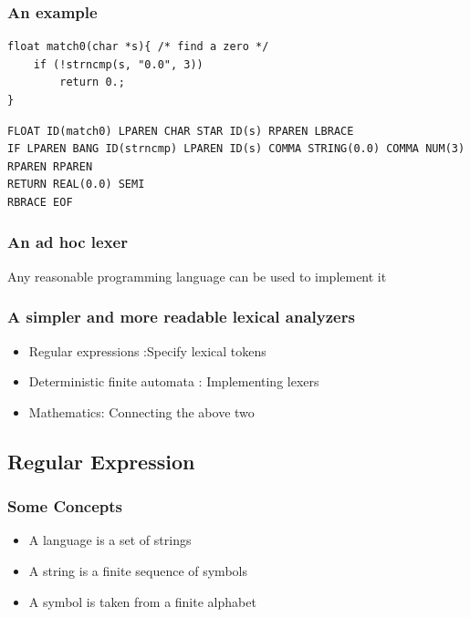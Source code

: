 \subsubsection{An example}
\begin{verbatim}
float match0(char *s){ /* find a zero */
    if (!strncmp(s, "0.0", 3))
        return 0.;
}
\end{verbatim}

\begin{verbatim}
FLOAT ID(match0) LPAREN CHAR STAR ID(s) RPAREN LBRACE 
IF LPAREN BANG ID(strncmp) LPAREN ID(s) COMMA STRING(0.0) COMMA NUM(3) RPAREN RPAREN 
RETURN REAL(0.0) SEMI 
RBRACE EOF
\end{verbatim}



\subsubsection{An ad hoc lexer}
Any reasonable programming language can be used to implement it

\subsubsection{A simpler and more readable lexical analyzers}
\begin{itemize}
    \item Regular expressions :Specify lexical tokens
    \item Deterministic finite automata : Implementing lexers
    \item Mathematics: Connecting the above two
\end{itemize}

\subsection{Regular Expression}
\subsubsection{Some Concepts}
\begin{itemize}
    \item A language is a set of strings
    \item A string is a finite sequence of symbols
    \item A symbol is taken from a finite alphabet
\end{itemize}

